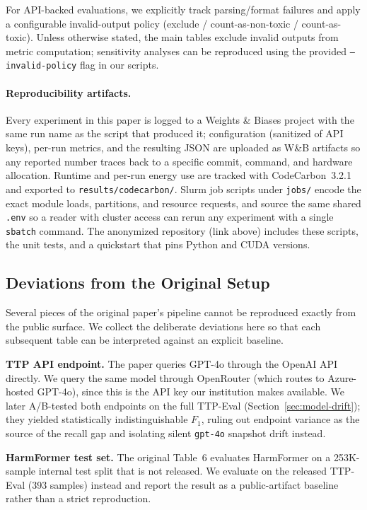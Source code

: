 \documentclass[10pt]{article} %
\begin{document}
For API-backed evaluations, we explicitly track parsing/format failures and apply a configurable invalid-output policy (exclude / count-as-non-toxic / count-as-toxic). Unless otherwise stated, the main tables exclude invalid outputs from metric computation; sensitivity analyses can be reproduced using the provided \texttt{--invalid-policy} flag in our scripts.

\paragraph{Reproducibility artifacts.}
Every experiment in this paper is logged to a Weights \& Biases project with the same run name as the script that produced it; configuration (sanitized of API keys), per-run metrics, and the resulting JSON are uploaded as W\&B artifacts so any reported number traces back to a specific commit, command, and hardware allocation. Runtime and per-run energy use are tracked with CodeCarbon~3.2.1 and exported to \texttt{results/codecarbon/}. Slurm job scripts under \texttt{jobs/} encode the exact module loads, partitions, and resource requests, and source the same shared \texttt{.env} so a reader with cluster access can rerun any experiment with a single \texttt{sbatch} command. The anonymized repository (link above) includes these scripts, the unit tests, and a quickstart that pins Python and CUDA versions.

\subsection{Deviations from the Original Setup}
\label{sec:deviations}

Several pieces of the original paper's pipeline cannot be reproduced exactly from the public surface. We collect the deliberate deviations here so that each subsequent table can be interpreted against an explicit baseline.

\textbf{TTP API endpoint.} The paper queries GPT-4o through the OpenAI API directly. We query the same model through OpenRouter (which routes to Azure-hosted GPT-4o), since this is the API key our institution makes available. We later A/B-tested both endpoints on the full TTP-Eval (Section~\ref{sec:model-drift}); they yielded statistically indistinguishable $F_1$, ruling out endpoint variance as the source of the recall gap and isolating silent \texttt{gpt-4o} snapshot drift instead.

\textbf{HarmFormer test set.} The original Table~6 evaluates HarmFormer on a 253K-sample internal test split that is not released. We evaluate on the released TTP-Eval (393 samples) instead and report the result as a public-artifact baseline rather than a strict reproduction.
\end{document}
